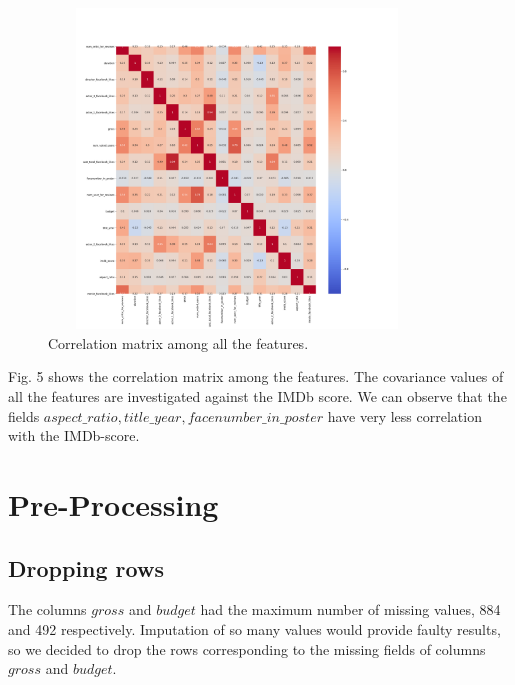 \documentclass[conference]{IEEEtran}
\begin{document}
\begin{figure}[H]
  \centering    
  \captionsetup{justification=centering}
  \includegraphics[height=8.5cm, width=10cm, trim={20mm 20mm 20mm 40mm},clip]{../visualizations/corr_matrix.png}
  \caption{Correlation matrix among all the features.}
  \label{fig:fig5}
\end{figure}
Fig. 5 shows the correlation matrix among the features. The covariance values of all the features are investigated against the IMDb score. We can observe that the fields $aspect\_ratio, title\_year, facenumber\_in\_poster$ have very less correlation with the IMDb-score. 

\newpage
\section{Pre-Processing}
\subsection{Dropping rows}
The columns $gross$ and $budget$ had the maximum number of missing values, 884 and 492 respectively. Imputation of so many values would provide faulty results, so we decided to drop the rows corresponding to the missing fields of columns $gross$ and $budget$.\\
\end{document}
